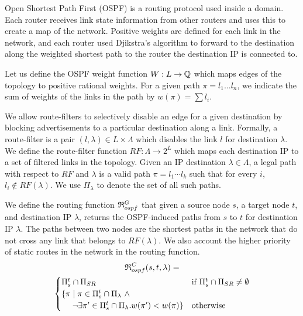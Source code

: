 Open Shortest Path First (OSPF) is a routing protocol used inside a
domain. Each router receives link state information from other routers
and uses this to create a map of the network. Positive weights
are defined for each link in the network, and 
each router used Djikstra's algorithm to
forward to the destination along the weighted shortest path 
to the router the destination IP is connected to. 

Let us
define the OSPF weight function $W: L \rightarrow \mathbb{Q}$ which 
maps edges of the topology to positive rational weights. 
For a given
path $\pi=l_1\ldots l_n$, we indicate the sum of weights of the
links in the path by $w(\pi)=\sum l_i$. 


We allow route-filters
to selectively disable an
edge for a given destination by  
blocking advertisements to a
particular destination along a link. 
Formally, a route-filter is a pair $(l,\lambda)\in L\times \Lambda$
which disables the link $l$ for destination $\lambda$. 
We define the route-filter function 
$RF: \Lambda \rightarrow 2^L$ which maps each destination IP
to a set of filtered links in the topology. 
Given an IP destination $\lambda\in \Lambda$, 
a legal path with respect to $RF$ and $\lambda$
is a valid path $\pi=l_1\cdots l_k$ such that for every $i$,
$l_i\not\in RF(\lambda)$.
We use $\Pi_\lambda$ to denote the set of all such paths.

We define the routing function 
$\mathfrak{R}_{ospf}^G$ 
that given 
a source node $s$,
a target node $t$,
and destination IP 
$\lambda$,
returns the OSPF-induced paths from $s$ to $t$ for destination IP $\lambda$.
The paths between two nodes are
the shortest paths in the network
that do not cross any link that belongs to $RF(\lambda)$. We also
account the higher priority of static routes 
in the network in the routing function.
\begin{multline} \label{eq:ospfmodel}
\mathfrak{R}_{ospf}^C(s,t,\lambda) = \\
\begin{cases}
\text{$\Pi_s^t \cap \Pi_{SR}$}  & \text{if $\Pi_s^t \cap \Pi_{SR} \not=\emptyset$} \\
\text{$\{\pi \mid  \pi\in \Pi_s^t\cap \Pi_\lambda ~\wedge $} & \\
\text{~~~~$\neg\exists \pi'\in\Pi_s^t\cap \Pi_\lambda . w(\pi')< w(\pi)\}$} & \text{otherwise}
\end{cases}
\end{multline}

